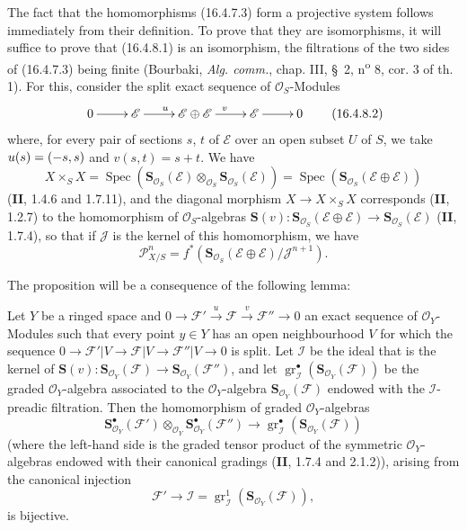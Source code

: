 The fact that the homomorphisms (16.4.7.3) form a projective system follows
immediately from their definition. To prove that they are isomorphisms, it
will suffice to
prove that (16.4.8.1) is an isomorphism, the filtrations of the two sides of
(16.4.7.3) being finite (Bourbaki, \emph{Alg. comm.}, chap. III, \S~2,
n\textsuperscript{o} 8, cor. 3 of th. 1). For this, consider the split exact
sequence of $\mathcal{O}_S$-Modules
\[
  \xymatrix{
    0 \ar[r] & \mathscr{E} \ar[r]^{u} &
    \mathscr{E}\oplus\mathscr{E} \ar[r]^{v} &
    \mathscr{E} \ar[r] & 0
  }
  \tag{16.4.8.2}
  \label{IV.16.4.8.2}
\]
where, for every pair of sections $s$, $t$ of $\mathscr{E}$ over an open subset
$U$ of $S$, we take $u(s)=(- s,s)$ and $v(s,t)=s+t$. We have
\[
  X\times_S X=\operatorname{Spec}
  (\mathbf{S}_{\mathcal{O}_S}(\mathscr{E})\otimes_{\mathcal{O}_S}
  \mathbf{S}_{\mathcal{O}_S}(\mathscr{E}))
  =\operatorname{Spec}(\mathbf{S}_{\mathcal{O}_S}
  (\mathscr{E}\oplus\mathscr{E}))
\]
(\textbf{II}, 1.4.6 and 1.7.11), and the diagonal morphism $X\to X\times_S X$ corresponds
(\textbf{II}, 1.2.7) to the homomorphism of $\mathcal{O}_S$-algebras
$\mathbf{S}(v):\mathbf{S}_{\mathcal{O}_S}(\mathscr{E}\oplus\mathscr{E})
\to\mathbf{S}_{\mathcal{O}_S}(\mathscr{E})$ (\textbf{II}, 1.7.4), so that if
$\mathscr{J}$ is the kernel of this homomorphism, we have
\[
  \mathscr{P}_{X/S}^n=f^*(\mathbf{S}_{\mathcal{O}_S}
  (\mathscr{E}\oplus\mathscr{E})/\mathscr{J}^{n+1}).
\]

The proposition will be a consequence of the following lemma:

\begin{lemma}[16.4.8.3]
\label{IV.16.4.8.3}
Let $Y$ be a ringed space and
$0\to\mathscr{F}'\xrightarrow{u}\mathscr{F}\xrightarrow{v}\mathscr{F}''\to0$
an exact sequence of $\mathcal{O}_Y$-Modules such that every point $y\in Y$
has an open neighbourhood $V$ for which the sequence
$0\to\mathscr{F}'|V\to\mathscr{F}|V\to\mathscr{F}''|V\to0$ is split.
Let $\mathscr{I}$ be the ideal that is the kernel of
$\mathbf{S}(v):\mathbf{S}_{\mathcal{O}_Y}(\mathscr{F})\to
\mathbf{S}_{\mathcal{O}_Y}(\mathscr{F}'')$, and let
$\operatorname{gr}_{\mathscr{I}}^\bullet
(\mathbf{S}_{\mathcal{O}_Y}(\mathscr{F}))$ be the graded $\mathcal{O}_Y$-algebra
associated to the $\mathcal{O}_Y$-algebra
$\mathbf{S}_{\mathcal{O}_Y}(\mathscr{F})$ \textup{endowed with the
$\mathscr{I}$-preadic filtration}. Then the homomorphism of graded
$\mathcal{O}_Y$-algebras
\[
  \mathbf{S}_{\mathcal{O}_Y}^{\bullet}(\mathscr{F}')
  \otimes_{\mathcal{O}_Y}
  \mathbf{S}_{\mathcal{O}_Y}^{\bullet}(\mathscr{F}'')
  \longrightarrow
  \operatorname{gr}_{\mathscr{I}}^\bullet
  (\mathbf{S}_{\mathcal{O}_Y}(\mathscr{F}))
  \tag{16.4.8.4}
  \label{IV.16.4.8.4}
\]
(where the left-hand side is the graded tensor product of the symmetric
$\mathcal{O}_Y$-algebras endowed with their canonical gradings
\textup{(\textbf{II}, 1.7.4 and 2.1.2)}), arising from the canonical injection
\[
  \mathscr{F}'\longrightarrow\mathscr{I}
  =\operatorname{gr}_{\mathscr{I}}^1
  (\mathbf{S}_{\mathcal{O}_Y}(\mathscr{F})),
\]
is bijective.
\end{lemma}


